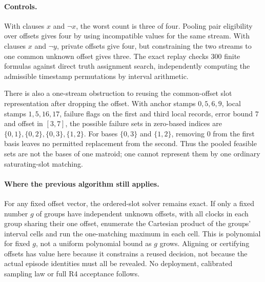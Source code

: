 \documentclass[11pt]{article}
\begin{document}
\paragraph{Controls.}
With clauses \(x\) and \(\neg x\), the worst count is three of four.
Pooling pair eligibility over offsets gives four by using incompatible
values for the same stream. With clauses \(x\) and \(\neg y\),
private offsets give four, but constraining the two streams to
one common unknown offset gives three. The exact replay checks
300 finite formulas against direct truth assignment search, independently
computing the admissible timestamp permutations by interval arithmetic.

There is also a one-stream obstruction to reusing the common-offset
slot representation after dropping the offset. With anchor stamps
\(0,5,6,9\), local stamps \(1,5,16,17\), failure flags on the
first and third local records, error bound \(7\) and offset in
\([3,7]\), the possible failure sets in zero-based indices are
\(\{0,1\},\{0,2\},\{0,3\},\{1,2\}\).
For bases \(\{0,3\}\) and \(\{1,2\}\), removing \(0\) from
the first basis leaves no permitted replacement from the second.
Thus the pooled feasible sets are not the bases of one matroid;
one cannot represent them by one ordinary saturating-slot matching.

\paragraph{Where the previous algorithm still applies.}
For any fixed offset vector, the ordered-slot solver remains
exact. If only a fixed number \(g\) of groups have independent
unknown offsets, with all clocks in each group sharing their one
offset, enumerate the Cartesian product of the groups' interval
cells and run the one-matching maximum in each cell. This is
polynomial for fixed \(g\), not a uniform polynomial bound as
\(g\) grows. Aligning or certifying offsets has value here because
it constrains a reused decision, not because the actual episode
identities must all be revealed. No deployment, calibrated
sampling law or full R4 acceptance follows.
\end{document}
